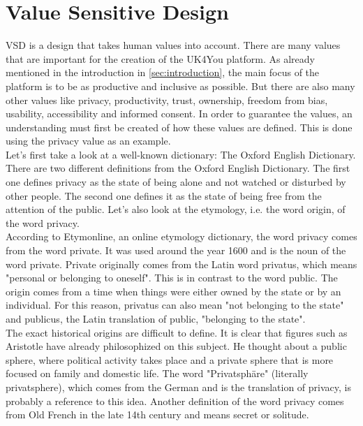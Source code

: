 \section{Value Sensitive Design}\label{sec:vsd}
VSD is a design that takes human values into account\cite{friedman-vsd}.
There are many values that are important for the creation of the UK4You platform.
As already mentioned in the introduction in \autoref{sec:introduction}, the main focus of the platform is to be as productive and inclusive as possible.
But there are also many other values like privacy, productivity, trust, ownership, freedom from bias, usability, accessibility and informed consent.
In order to guarantee the values, an understanding must first be created of how these values are defined.
This is done using the privacy value as an example.\\

Let's first take a look at a well-known dictionary: The Oxford English Dictionary.
There are two different definitions from the Oxford English Dictionary\cite{oxford-dictionary}.
The first one defines privacy as the state of being alone and not watched or disturbed by other people.
The second one defines it as the state of being free from the attention of the public.
Let's also look at the etymology, i.e. the word origin, of the word privacy.\\

According to Etymonline, an online etymology dictionary, the word privacy comes from the word private\cite{etymonline}.
It was used around the year 1600 and is the noun of the word private.
Private originally comes from the Latin word privatus, which means "personal or belonging to oneself". %
This is in contrast to the word public.
The origin comes from a time when things were either owned by the state or by an individual.
For this reason, privatus can also mean "not belonging to the state" and publicus, the Latin translation of public, "belonging to the state". \\ %

The exact historical origins are difficult to define.
It is clear that figures such as Aristotle have already philosophized on this subject\cite{stanford-philosophy}.
He thought about a public sphere, where political activity takes place and a private sphere that is more focused on family and domestic life.
The word "Privatsphäre" (literally privatsphere), which comes from the German and is the translation of privacy, is probably a reference to this idea.
Another definition of the word privacy comes from Old French in the late 14th century and means secret or solitude.\\

